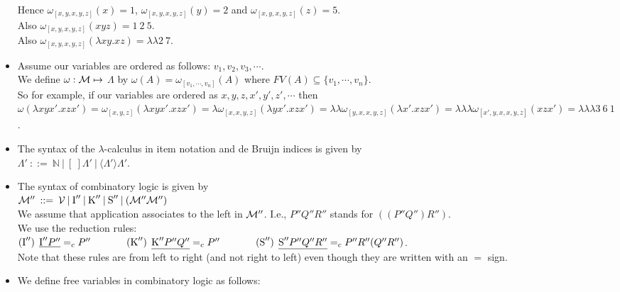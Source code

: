 \documentclass[11pt]{article}
\newcommand \cI {\mbox{I}''}
\newcommand \cK {\mbox{K}''}
\newcommand \mycS {\mbox{S}''}
\newcommand \cM {\cal M}
\begin{document}
\begin{itemize}
	      Hence $\omega_{[x, y, x,y,z]}(x) = 1$, $\omega_{[x, y, x,y,z]}(y) = 2$ and $\omega_{[x, y, x,y,z]}(z) = 5$.\\
	      Also $\omega_{[x, y, x,y,z]}(xyz) = 1\:2\:5$.\\
	      Also $\omega_{[x, y, x,y,z]}(\lambda xy.xz) = \lambda \lambda 2\:7$.
	\item
	      Assume our variables are ordered as follows: $v_1, v_2, v_3, \cdots$.\\
	      We define $\omega : \cM \mapsto$ $\Lambda$
	      by $\omega(A) = \omega_{[v_1,\cdots, v_n]}(A)$ where 
	      $FV(A) \subseteq \{v_1,\cdots,v_n\}$.\\
	      So for example, if our variables are ordered as $x,y,z,x',y',z', \cdots$ then $\omega(\lambda xyx'.xzx')
	      = \omega_{[x,y,z]}(\lambda xyx'.xzx') = \lambda\omega_{[x,x,y,z]}(\lambda yx'.xzx') = \lambda\lambda\omega_{[y,x,x,y,z]}(\lambda x'.xzx') = \lambda\lambda\lambda\omega_{[x',y,x,x,y,z]}(xzx') = \lambda\lambda\lambda 3\:6\:1$.
	\item
	      The syntax of the $\lambda$-calculus in item notation and de Bruijn indices is given by\\
	      $\Lambda'  \: ::=  \:  {\mathbb{N}} \:|\: [\:]{\Lambda'} \:|\: \langle \Lambda' \rangle \Lambda'$.
	\item
	      The syntax of combinatory logic is given by\\
	      $\cM''  \: ::=  \:  {\cal V} \:|\: \cI \:|\: \cK \:|\:\mycS\:|\: (\cM''\cM'')$\\
	      We assume that application associates to the left in $\cM''$. I.e., $P''Q''R''$ stands for $((P''Q'')R'')$.\\
	      We use  the reduction rules: \\
	      $(\cI) \: \:  \underline{\cI P''} =_c P'' \hspace{0.5in} (\cK) \: \:  \underline{\cK P''Q''} =_c P'' \hspace{0.5in} (\mycS) \:\:   \underline{\mycS P''Q''R''} =_c P''R''(Q''R'')$.\\
	      Note that these rules are from left to right (and not right to left) even though they are written with an $=$ sign.
	\item
	      We define free variables in combinatory logic as follows:\\

\end{itemize}
\end{document}
